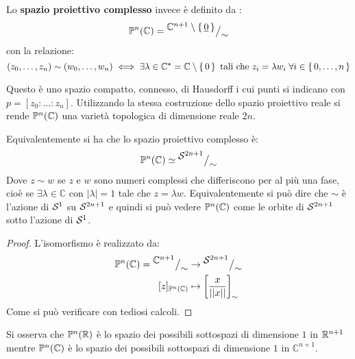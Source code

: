 \begin{definition}
Lo \textbf{spazio proiettivo complesso} invece è definito da :
\[
  \mathbb{P}^{n} (\mathbb{C}) = {^{\textstyle \mathbb{C}^{n+1} \setminus \set{\underline{0}}}\big/_{\textstyle \sim}}
\]
con la relazione:
\[
  (z_0, \dots, z_n) \sim (w_0, \dots, w_n) \iff \exists \lambda \in \mathbb{C}^\star= \mathbb{C} \setminus \set{0} \text{ tali che } z_i = \lambda w_i \; \forall i \in \set{0, \dots, n}
\]
\end{definition}
Questo è uno spazio compatto, connesso, di Hausdorff i cui punti si indicano con
$ p = [z_0 : \dots : z_n] $. Utilizzando la stessa costruzione dello spazio proiettivo
reale si rende $ \mathbb{P}^{n} (\mathbb{C}) $ una varietà topologica di dimensione reale $ 2n $.
\begin{lemma}
  Equivalentemente si ha che lo spazio proiettivo complesso è:
  \[
    \mathbb{P}^{n} (\mathbb{C}) \simeq {^{\textstyle \mathcal{S}^{2n+1}}\big/_{\textstyle {\sim}}}
  \]
  Dove $ z \sim w $ se $ z $ e $ w $ sono numeri complessi che differiscono per al
  più una fase, cioè se $ \exists \lambda \in \mathbb{C} $ con
  $ | \lambda | = 1 $ tale che $ z = \lambda w $. Equivalentemente si può dire che
  $ \sim $ è l'azione di $ \mathcal{S}^{1} $ su $ \mathcal{S}^{2n+1} $ e quindi si può vedere
  $ \mathbb{P}^{n} (\mathbb{C}) $ come le orbite di $ \mathcal{S}^{2n+1} $ sotto l'azione di $ \mathcal{S}^{1} $.
\end{lemma}
\begin{proof}
  L'isomorfismo è realizzato da:
  \begin{align*}
    \mathbb{P}^{n} (\mathbb{C}) = {^{\textstyle \mathbb{C}^{n+1}}\big/_{\textstyle \sim}} & \to  {^{\textstyle \mathcal{S}^{2n+1}}\big/_{\textstyle \sim}} \\
    [z]_{\mathbb{P}^{n} (\mathbb{C})} & \mapsto \left[\frac{x}{|| x ||}\right]_\sim
  \end{align*}
  Come si può verificare con tediosi calcoli.
\end{proof}
\begin{osservation}
  Si osserva che $ \mathbb{P}^{n} (\mathbb{R}) $ è lo spazio dei possibili sottospazi di dimensione
  $ 1 $ in $ \mathbb{R}^{n+1} $ mentre $ \mathbb{P}^{n} (\mathbb{C}) $ è lo spazio dei possibili sottospazi
  di dimensione $ 1 $ in $ \mathbb{C}^{n+1} $.
\end{osservation}
